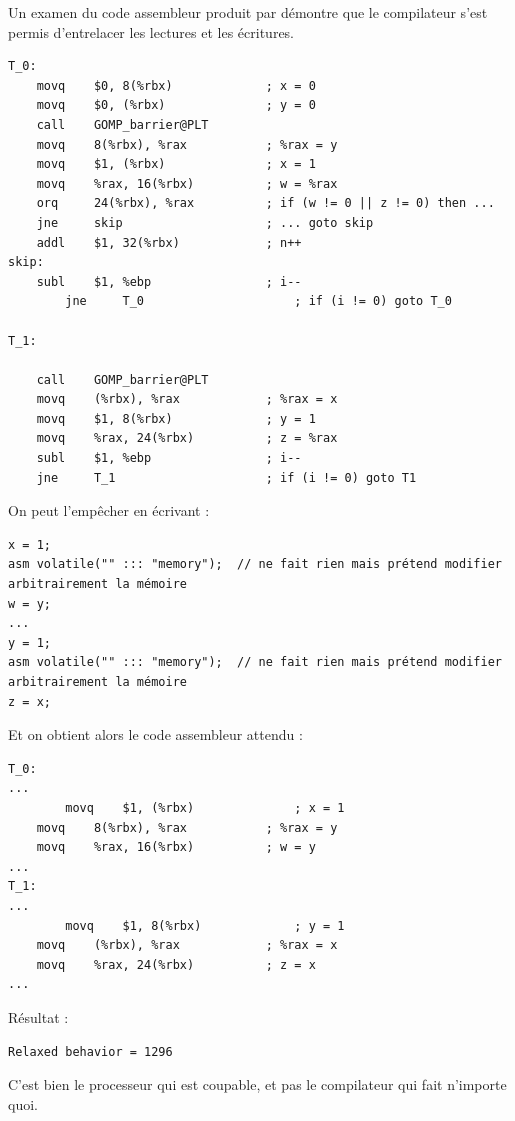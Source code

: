 \begin{danger}
Un examen du code assembleur produit par  démontre que le
compilateur s'est permis d'entrelacer les lectures et les écritures.
\begin{myfilet}
\begin{verbatim}
T_0:
	movq    $0, 8(%rbx)             ; x = 0
	movq    $0, (%rbx)              ; y = 0
	call    GOMP_barrier@PLT
	movq    8(%rbx), %rax           ; %rax = y
	movq    $1, (%rbx)              ; x = 1
	movq    %rax, 16(%rbx)          ; w = %rax
	orq     24(%rbx), %rax          ; if (w != 0 || z != 0) then ...
	jne     skip                    ; ... goto skip
	addl    $1, 32(%rbx)            ; n++
skip:
	subl    $1, %ebp                ; i--
        jne     T_0                     ; if (i != 0) goto T_0

T_1:

	call    GOMP_barrier@PLT
	movq    (%rbx), %rax            ; %rax = x
	movq    $1, 8(%rbx)             ; y = 1
	movq    %rax, 24(%rbx)          ; z = %rax
	subl    $1, %ebp                ; i--
	jne     T_1                     ; if (i != 0) goto T1
\end{verbatim}
\end{myfilet}%

On peut l'empêcher en écrivant :
\begin{myfilet}
\begin{verbatim}
x = 1;
asm volatile("" ::: "memory");  // ne fait rien mais prétend modifier arbitrairement la mémoire
w = y;
...	
y = 1;
asm volatile("" ::: "memory");  // ne fait rien mais prétend modifier arbitrairement la mémoire
z = x;
\end{verbatim}
\end{myfilet}

Et on obtient alors le code assembleur attendu :
\begin{myfilet}
\begin{verbatim}
T_0:
...
        movq    $1, (%rbx)              ; x = 1
	movq    8(%rbx), %rax           ; %rax = y
	movq    %rax, 16(%rbx)          ; w = y
...
T_1:
...
        movq    $1, 8(%rbx)             ; y = 1
	movq    (%rbx), %rax            ; %rax = x
	movq    %rax, 24(%rbx)          ; z = x
...
\end{verbatim}
\end{myfilet}

Résultat :
\begin{verbatim}
Relaxed behavior = 1296
\end{verbatim}

C'est bien le processeur qui est coupable, et pas le compilateur qui fait
n'importe quoi.
\end{danger}


